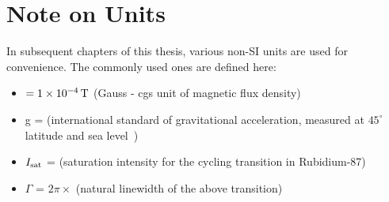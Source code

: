 \section{Note on Units}

In subsequent chapters of this thesis, various non-SI units are used
for convenience. The commonly used ones are defined here:
\begin{itemize}
  \item {} \(= \sivalue{1e-4}{\tesla}\) (Gauss - cgs
    unit of magnetic flux density)
    \item g = 
      (international standard of gravitational acceleration, measured
      at $45^\circ$ latitude and sea level~\cite{accelStandard})
    \item $I_\textnormal{sat}$ = 
      (saturation intensity for the  cycling transition in
      Rubidium-87)
    \item $\Gamma$ = $2\pi \times$  (natural
      linewidth of the above transition)
  \end{itemize}
